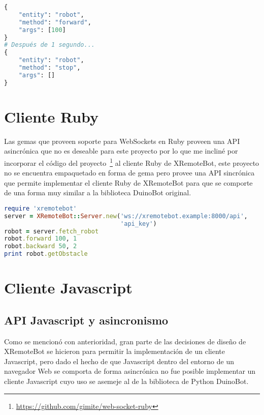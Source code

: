 \begin{lstlisting}[language=Python,
caption={Mensajes generados al invocar \texttt{robot.forward(100, 1)} en
XRemoteBot para Python}, label=lst:ejemplo_xremotebot_python_json]
{
    "entity": "robot",
    "method": "forward",
    "args": [100]
}
# Después de 1 segundo...
{
    "entity": "robot",
    "method": "stop",
    "args": []
}
\end{lstlisting}


\section{Cliente Ruby}\label{ch4:ruby}

Las gemas que proveen soporte para WebSockets en Ruby proveen una API
asincrónica que no es deseable para este proyecto por lo que me incliné
por incorporar el código del
proyecto~\footnote{\url{https://github.com/gimite/web-socket-ruby}}
al cliente Ruby de XRemoteBot, este proyecto no se encuentra empaquetado
en forma de gema pero provee una API sincrónica que permite implementar
el cliente Ruby de XRemoteBot para que se comporte de una forma muy similar
a la biblioteca DuinoBot original.

\begin{lstlisting}[language=Ruby,
caption={Ejemplo usando XRemoteBot para Ruby},
label=lst:ejemplo_xremotebot_ruby]
require 'xremotebot'
server = XRemoteBot::Server.new('ws://xremotebot.example:8000/api',
                                'api_key')
robot = server.fetch_robot
robot.forward 100, 1
robot.backward 50, 2
print robot.getObstacle
\end{lstlisting}



\section{Cliente Javascript}\label{ch4:javascript}

\subsection{API Javascript y asincronismo}
Como se mencionó con anterioridad, gran parte de las decisiones de diseño de XRemoteBot
se hicieron para permitir la implementación de un cliente Javascript, pero dado el hecho
de que Javascript dentro del entorno de un navegador Web se comporta de forma asincrónica
no fue posible implementar un cliente Javascript cuyo uso se asemeje al de la biblioteca
de Python DuinoBot.

